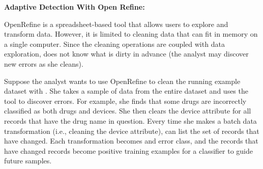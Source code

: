 \noindent\textbf{Adaptive Detection With Open Refine: }
\begin{example}
OpenRefine is a spreadsheet-based tool that allows users to explore and transform data.
However, it is limited to cleaning data that can fit in memory on a single computer.
Since the cleaning operations are coupled with data exploration, \sys does not know what is dirty in advance (the analyst may discover new errors as she cleans).

Suppose the analyst wants to use OpenRefine to clean the running example dataset with \sys.
She takes a sample of data from the entire dataset and uses the tool to discover errors.
For example, she finds that some drugs are incorrectly classified as both drugs and devices.
She then clears the device attribute for all records that have the drug name in question.
Every time she makes a batch data transformation (i.e., cleaning the device attribute), \sys can list the set of records that have changed.
Each transformation becomes and error class, and the records that have changed records become positive training examples for a classifier to guide future samples.
\end{example}